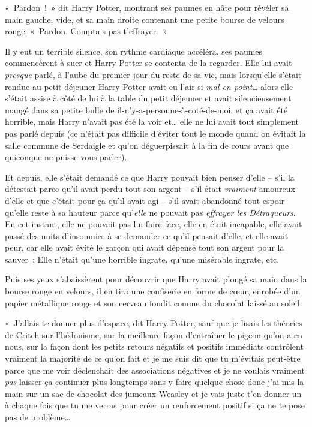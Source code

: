 «~Pardon~!~»
dit Harry Potter, montrant ses paumes en hâte pour révéler sa main gauche, vide, et sa main droite contenant une petite bourse de velours rouge.
«~Pardon.
Comptais pas t'effrayer.~»

Il y eut un terrible silence, son rythme cardiaque accéléra, ses paumes commencèrent à suer et Harry Potter se contenta de la regarder.
Elle lui avait \emph{presque} parlé, à l'aube du premier jour du reste de sa vie, mais lorsqu'elle s'était rendue au petit déjeuner Harry Potter avait eu l'air si \emph{mal en point}… alors elle s'était assise à côté de lui à la table du petit déjeuner et avait silencieusement mangé dans sa petite bulle de il-n'y-a-personne-à-coté-de-moi, et ça avait été horrible, mais Harry n'avait pas été la voir et… elle ne lui avait tout simplement pas parlé depuis (ce n'était pas difficile d'éviter tout le monde quand on évitait la salle commune de Serdaigle et qu'on déguerpissait à la fin de cours avant que quiconque ne puisse vous parler).

Et depuis, elle s'était demandé ce que Harry pouvait bien penser d'elle -- s'il la détestait parce qu'il avait perdu tout son argent -- s'il était \emph{vraiment} amoureux d'elle et que c'était pour ça qu'il avait agi -- s'il avait abandonné tout espoir qu'elle reste à sa hauteur parce qu'\emph{elle} ne pouvait pas \emph{effrayer les Détraqueurs}.
En cet instant, elle ne pouvait pas lui faire face, elle en était incapable, elle avait passé des nuits d'insomnies à se demander ce qu'il pensait d'elle, et elle avait peur, car elle avait évité le garçon qui avait dépensé tout son argent pour la sauver~; Elle n'était qu'une horrible ingrate, qu'une misérable ingrate, etc.

Puis ses yeux s'abaissèrent pour découvrir que Harry avait plongé sa main dans la bourse rouge en velours, il en tira une confiserie en forme de cœur, enrobée d'un papier métallique rouge et son cerveau fondit comme du chocolat laissé au soleil.

«~J'allais te donner plus d'espace, dit Harry Potter, sauf que je lisais les théories de Critch sur l'hédonisme, sur la meilleure façon d'entraîner le pigeon qu'on a en nous, sur la façon dont les petits retours négatifs et positifs immédiats contrôlent vraiment la majorité de ce qu'on fait et je me suis dit que tu m'évitais peut-être parce que me voir déclenchait des associations négatives et je ne voulais vraiment \emph{pas} laisser ça continuer plus longtemps sans y faire quelque chose donc j'ai mis la main sur un sac de chocolat des jumeaux Weasley et je vais juste t'en donner un à chaque fois que tu me verras pour créer un renforcement positif si ça ne te pose pas de problème…

